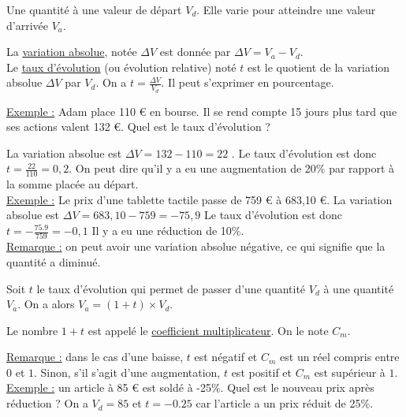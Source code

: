 \documentclass[french]{book}
\begin{document}
Une quantité à une valeur de départ $V_d$. Elle varie pour atteindre une valeur d’arrivée $V_a$.

\begin{defn}
La \underline{variation absolue}, notée $\Delta V$ est donnée par $\Delta V = V_a - V_d$. \\

Le \underline{taux d’évolution} (ou évolution relative) noté $t$ est le quotient de la variation absolue $\Delta V$ par $V_d$. On a $t=\frac{\Delta V}{V_d}$. Il peut s’exprimer en pourcentage.
\end{defn}

\underline{Exemple :} Adam place 110 \euro{} en bourse. Il se rend compte 15 jours plus tard que ses actions valent 132 \euro{}. Quel est le taux d’évolution ? 

La variation absolue est $\Delta V = 132- 110=22$  . Le taux d’évolution est donc $t=\frac{22}{110}=0,2$.
On peut dire qu’il y a eu une augmentation de 20\% par rapport à la somme placée au départ.\\


\underline {Exemple :} Le prix d’une tablette tactile passe de 759 \euro{} à 683,10 \euro{}.
La variation absolue est  $\Delta V =683,10 - 759 = -75,9$   Le taux d’évolution est donc $t=-\frac{75.9}{759}=-0,1$ 
Il y a eu une réduction de 10\%.\\


\underline{Remarque :} on peut avoir une variation absolue négative, ce qui signifie que la quantité a diminué.

\begin{prop} 
Soit $t$ le taux d’évolution qui permet de passer d’une quantité $V_d$ à une quantité $V_a$. On a alors $V_a=(1+t)\times V_d$.
\end{prop}

\begin{defn}
Le nombre $1+t$ est appelé le \underline{coefficient multiplicateur}. On le note $C_m$.
\vspace{0.5cm}
\end{defn}

\underline{Remarque :} dans le cas d’une baisse, $t$ est négatif et $C_m$ est un réel compris entre $0$ et $1$. Sinon, s’il s’agit d’une augmentation, $t$ est positif et $C_m$ est supérieur à $1$.\\

\underline{Exemple :} un article à 85 \euro{} est soldé à -25\%. Quel est le nouveau prix après réduction ?
On a $V_d=85$ et $t=-0.25$ car l'article a un prix réduit de 25\%.
\end{document}
